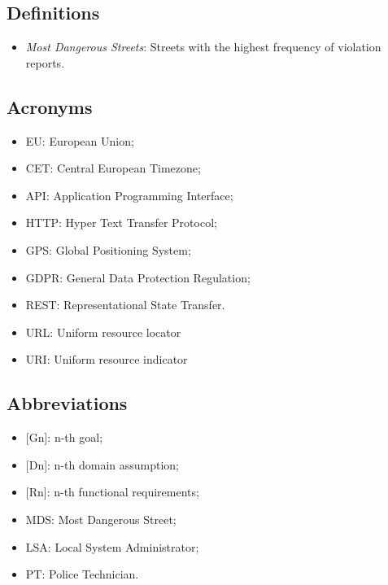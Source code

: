\subsection{Definitions}
\begin{itemize}
  \item \textit{Most Dangerous Streets}: Streets with the highest frequency of violation reports.
\end{itemize}

\subsection{Acronyms}
\begin{itemize}
  \item EU: European Union;
  \item CET: Central European Timezone;
  \item API: Application Programming Interface;
  \item HTTP: Hyper Text Transfer Protocol;
  \item GPS: Global Positioning System;
  \item GDPR: General Data Protection Regulation;
  \item REST: Representational State Transfer.
  \item URL: Uniform resource locator
  \item URI: Uniform resource indicator
\end{itemize}

\subsection{Abbreviations}
\begin{itemize}
  \item {[Gn]}: n-th goal;
  \item {[Dn]}: n-th domain assumption;
  \item {[Rn]}: n-th functional requirements;
  \item MDS: Most Dangerous Street;
  \item LSA: Local System Administrator;
  \item PT: Police Technician.
\end{itemize}
